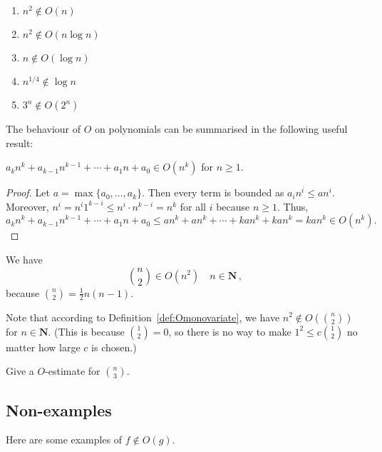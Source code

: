 \documentclass{tstextbook}
\begin{document}
\begin{example}
  \begin{enumerate}
\item $n^2\notin O(n)$
\item $n^2\notin O(n\log n)$
\item $n\notin O(\log n)$
\item $n^{1/4}\notin \log n$
\item $3^n\notin O(2^n)$
  \end{enumerate}
\end{example}

The behaviour of $O$ on polynomials can be summarised in the following useful result:

\begin{theorem}
   $a_kn^k +a_{k-1}n^{k-1} + \cdots + a_1 n + a_0 \in O(n^k)$ for $n\geq 1$.
\end{theorem}

\begin{proof}
  Let $a=\max\{a_0,\ldots, a_k\}$. 
  Then every term is bounded as $a_in^i \leq an^i$.
  Moreover, $n^i = n^i 1^{k-i}\leq n^i\cdot n^{k-i} = n^k$ for all $i$ because $n\geq 1$.
  Thus, \[
    a_kn^k +a_{k-1}n^{k-1} + \cdots + a_1 n + a_0  \leq
    an^k +an^k + \cdots + ka n^k + k an^k = kan^k \in O(n^k).\]
\end{proof}


\begin{example}
 We have
  \[ \binom{n}{2} \in O(n^2)\quad n\in\mathbf N\,,\]
  because  $\binom{n}{2} = \frac12n (n-1)$.
\end{example}


\begin{example}
  \label{ref:binowarning}
  Note that according to Definition~\ref{def:Omonovariate}, we have $n^2 \notin O(\binom{n}{2})$ for $n\in\mathbf N$.
  (This is because $\binom{1}{2}= 0$, so there is no way to make $1^2 \leq c \binom{1}{2}$ no matter how large $c$ is chosen.)
\end{example}

\begin{exercise}
  Give a $O$-estimate for $\binom{n}{3}$.
\end{exercise}

\subsection{Non-examples}

Here are some examples of $f\notin O(g)$.
\end{document}
